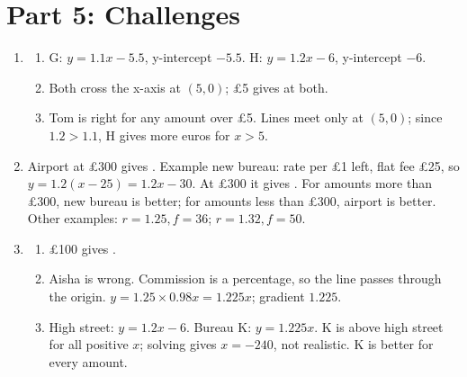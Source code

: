 \documentclass[12pt,a4paper]{article}
\begin{document}
\section*{Part 5: Challenges}

\begin{enumerate}[resume]
\item
\begin{enumerate}
\item G: \(y=1.1x-5.5\), y-intercept \(-5.5\). H: \(y=1.2x-6\), y-intercept \(-6\).
\item Both cross the x-axis at \((5,0)\); \pounds5 gives  at both.
\item Tom is right for any amount over \pounds5. Lines meet only at \((5,0)\); since \(1.2>1.1\), H gives more euros for \(x>5\).
\end{enumerate}

\item Airport at \pounds300 gives . Example new bureau: rate  per \pounds1 left, flat fee \pounds25, so \(y=1.2(x-25)=1.2x-30\). At \pounds300 it gives . For amounts more than \pounds300, new bureau is better; for amounts less than \pounds300, airport is better. Other examples: \(r=1.25, f=36\); \(r=1.32, f=50\).

\item
\begin{enumerate}
\item \pounds100 gives .
\item Aisha is wrong. Commission is a percentage, so the line passes through the origin. \(y=1.25\times0.98x=1.225x\); gradient \(1.225\).
\item High street: \(y=1.2x-6\). Bureau K: \(y=1.225x\). K is above high street for all positive \(x\); solving gives \(x=-240\), not realistic. K is better for every amount.
\end{enumerate}
\end{enumerate}
\end{document}
